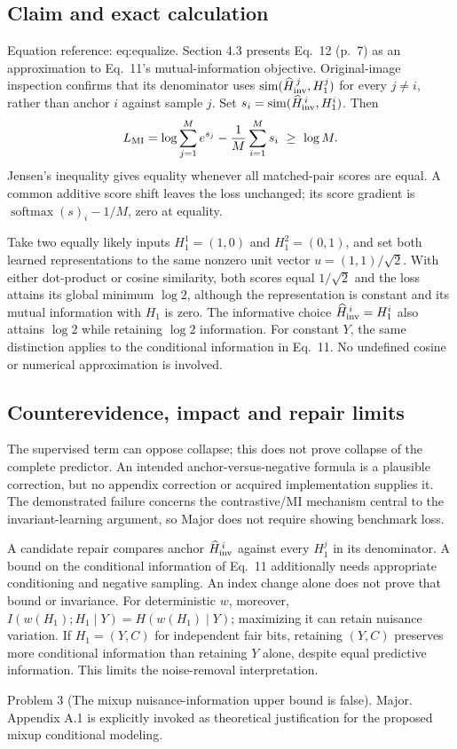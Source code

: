 \documentclass[10pt]{article}
\begin{document}
\subsection*{Claim and exact calculation}
Equation reference: eq:equalize. Section 4.3 presents Eq. 12 (p. 7) as an approximation to Eq. 11’s mutual-information objective. Original-image inspection confirms that its denominator uses \(\operatorname{sim}(\widehat H_{\rm inv}^{\,j},H_1^j)\) for every \(j\ne i\), rather than anchor \(i\) against sample \(j\). Set \(s_i=\operatorname{sim}(\widehat H_{\rm inv}^{\,i},H_1^i)\). Then \[
 L_{\rm MI}=\log\sum_{j=1}^M e^{s_j}
             -\frac1M\sum_{i=1}^M s_i
 \ \geq\ \log M.\] Jensen’s inequality gives equality whenever all matched-pair scores are equal. A common additive score shift leaves the loss unchanged; its score gradient is \(\operatorname{softmax}(s)_i-1/M\), zero at equality.\par
Take two equally likely inputs \(H_1^1=(1,0)\) and \(H_1^2=(0,1)\), and set both learned representations to the same nonzero unit vector \(u=(1,1)/\sqrt2\). With either dot-product or cosine similarity, both scores equal \(1/\sqrt2\) and the loss attains its global minimum \(\log2\), although the representation is constant and its mutual information with \(H_1\) is zero. The informative choice \(\widehat H_{\rm inv}^{\,i}=H_1^i\) also attains \(\log2\) while retaining \(\log2\) information. For constant \(Y\), the same distinction applies to the conditional information in Eq. 11. No undefined cosine or numerical approximation is involved.\par
\subsection*{Counterevidence, impact and repair limits}
The supervised term can oppose collapse; this does not prove collapse of the complete predictor. An intended anchor-versus-negative formula is a plausible correction, but no appendix correction or acquired implementation supplies it. The demonstrated failure concerns the contrastive/MI mechanism central to the invariant-learning argument, so Major does not require showing benchmark loss.\par
A candidate repair compares anchor \(\widehat H_{\rm inv}^{\,i}\) against every \(H_1^j\) in its denominator. A bound on the conditional information of Eq. 11 additionally needs appropriate conditioning and negative sampling. An index change alone does not prove that bound or invariance. For deterministic \(w\), moreover, \(I(w(H_1);H_1\mid Y)=H(w(H_1)\mid Y)\); maximizing it can retain nuisance variation. If \(H_1=(Y,C)\) for independent fair bits, retaining \((Y,C)\) preserves more conditional information than retaining \(Y\) alone, despite equal predictive information. This limits the noise-removal interpretation.\par
Problem 3 (The mixup nuisance-information upper bound is false).  Major. Appendix A.1 is explicitly invoked as theoretical justification for the proposed mixup conditional modeling.\par
\end{document}
